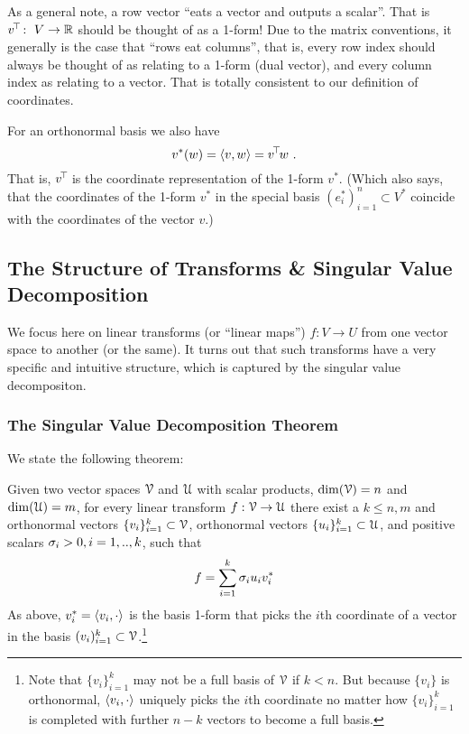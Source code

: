 As a general note, a row vector ``eats a vector and outputs a
scalar''. That is $v^{\!\top\!}:~ V \to {\mathbb{R}}$ should be thought of as a
1-form! Due to the matrix conventions, it generally is the case that
``rows eat columns'', that is, every row index should always be
thought of as relating to a 1-form (dual vector), and every column
index as relating to a vector. That is totally consistent to our
definition of coordinates.

For an orthonormal basis we also have
\begin{equation}
 v^*(w) = \langle v,w\rangle = v^{\!\top\!} w ~.
\end{equation}
That is, $v^{\!\top\!}$ is the coordinate representation of the 1-form
$v^*$. (Which also says, that the coordinates of the 1-form $v^*$ in the
special basis $(e_i^*)_{i=1}^n \subset V^*$ coincide with the coordinates of the vector $v$.)

\subsection{The Structure of Transforms \& Singular Value Decomposition}

We focus here on linear transforms (or ``linear maps'') $f: V \to U$
from one vector space to another (or the same). It turns out that
such transforms have a very specific and intuitive structure, which
is captured by the singular value decompositon.

\subsubsection{The Singular Value Decomposition Theorem}

We state the following theorem:

\begin{myTheorem}
Given two vector spaces ${\cal V}$ and ${\cal U}$ with scalar products,
$\dim({\cal V})=n$ and $\dim({\cal U})=m$, for every linear transform
$f: {\cal V} \to {\cal U}$ there exist a $k\le n,m$ and 
orthonormal vectors $\{v_i\}_{i=1}^k \subset {\cal V}$, orthonormal vectors
$\{u_i\}_{i=1}^k\subset {\cal U}$, and positive scalars $\sigma_i>0, i=1,..,k$,
such that
\begin{equation}
 f = \sum_{i=1}^k \sigma_i u_i v_i^* 
\end{equation}
As above, $v_i^*=\langle v_i, \cdot\rangle$ is the basis 1-form that picks the
$i$th coordinate of a vector in the basis $(v_i)_{i=1}^k \subset {\cal V}$.\footnote{Note that $\{v_i\}_{i=1}^k$ may not be a full basis of ${\cal V}$ if $k<n$. But
because $\{v_i\}$ is orthonormal, $\langle v_i, \cdot\rangle$ uniquely picks the
$i$th coordinate no matter how $\{v_i\}_{i=1}^k$ is completed with
further $n-k$ vectors to become a full basis.}
\end{myTheorem}

